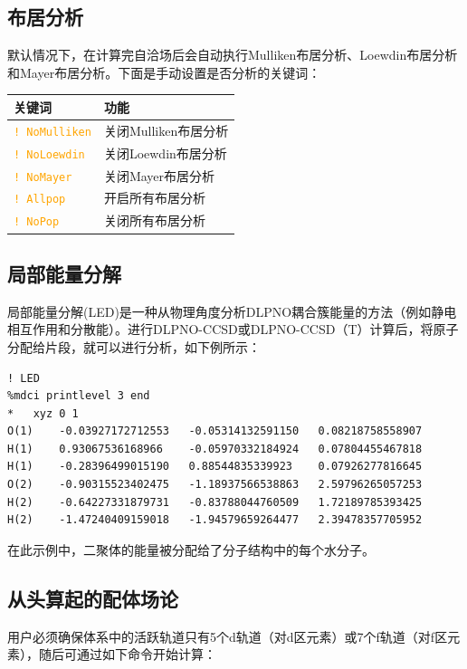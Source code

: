 \documentclass{ctexart}
\newcommand{\cmd}[1]{ \textcolor{orange}{\texttt{#1}} }
\begin{document}
	\subsection{布居分析} 
	
	默认情况下，在计算完自洽场后会自动执行Mulliken布居分析、Loewdin布居分析和Mayer布居分析。下面是手动设置是否分析的关键词：
	
	\begin{table}[H]
		\centering
		\begin{tabular}{ll}
			\toprule
			\textbf{关键词 }           & \textbf{功能}             \\
			\midrule
			 \cmd{! NoMulliken}  & 关闭Mulliken布居分析 \\
			 \cmd{! NoLoewdin}   & 关闭Loewdin布居分析  \\
			 \cmd{! NoMayer}     & 关闭Mayer布居分析  \\
			 \cmd{! Allpop}      & 开启所有布居分析       \\
			 \cmd{! NoPop}       & 关闭所有布居分析      \\
			 \bottomrule
		\end{tabular}
	\end{table}
	
	\subsection{局部能量分解} 
	
	局部能量分解(LED)是一种从物理角度分析DLPNO耦合簇能量的方法（例如静电相互作用和分散能）。进行DLPNO-CCSD或DLPNO-CCSD（T）计算后，将原子分配给片段，就可以进行分析，如下例所示：
	
	\begin{lstlisting}
! LED
%mdci printlevel 3 end
*	xyz 0 1
O(1)	-0.03927172712553	-0.05314132591150	0.08218758558907
H(1)	0.93067536168966	-0.05970332184924	0.07804455467818
H(1)	-0.28396499015190	0.88544835339923	0.07926277816645
O(2)	-0.90315523402475	-1.18937566538863	2.59796265057253
H(2)	-0.64227331879731	-0.83788044760509	1.72189785393425
H(2)	-1.47240409159018	-1.94579659264477	2.39478357705952
	\end{lstlisting}
	
	在此示例中，二聚体的能量被分配给了分子结构中的每个水分子。
	
	\subsection{从头算起的配体场论} 
	
	用户必须确保体系中的活跃轨道只有5个d轨道（对d区元素）或7个f轨道（对f区元素），随后可通过如下命令开始计算：
	
\end{document}
